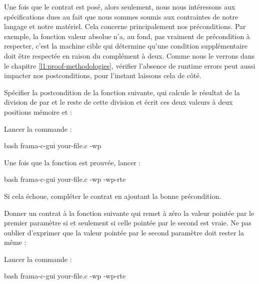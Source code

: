 Une fois que le contrat est posé, alors seulement, nous nous intéressons aux
spécifications dues au fait que nous sommes soumis aux contraintes de notre langage
et notre matériel. Cela concerne principalement nos préconditions. Par exemple,
la fonction valeur absolue n'a, au fond, pas  vraiment de précondition à respecter,
c'est la machine cible qui détermine qu'une condition supplémentaire doit être
respectée en raison du complément à deux. Comme nous le verrons dans le chapitre
\ref{l1:proof-methodologies}, vérifier l'absence de runtime errors peut aussi
impacter nos postconditions, pour l'instant laissons cela de côté.






Spécifier la postcondition de la fonction suivante, qui calcule le résultat
de la division de  par  et le reste de cette
division et écrit ces deux valeurs à deux positions mémoire 
et  :




Lancer la commande :


\begin{CodeBlock}{bash}
frama-c-gui your-file.c -wp
\end{CodeBlock}


Une fois que la fonction est prouvée, lancer :

\begin{CodeBlock}{bash}
frama-c-gui your-file.c -wp -wp-rte
\end{CodeBlock}


Si cela échoue, compléter le contrat en ajoutant la bonne précondition.




Donner un contrat à la fonction suivante qui remet à zéro la valeur
pointée par le premier paramètre si et seulement si celle pointée par le
second est vraie. Ne pas oublier d'exprimer que la valeur pointée par le second
paramètre doit rester la même :




Lancer la commande :


\begin{CodeBlock}{bash}
frama-c-gui your-file.c -wp -wp-rte
\end{CodeBlock}




